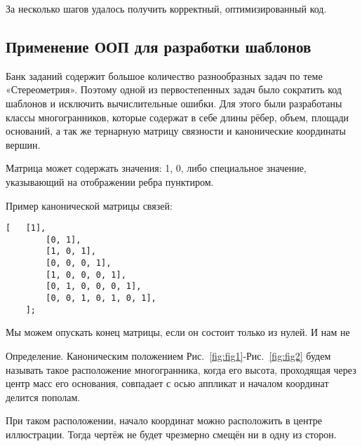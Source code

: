 За несколько шагов удалось получить корректный, оптимизированный код.

\subsection{Применение ООП для разработки шаблонов}


Банк заданий содержит большое количество разнообразных задач по теме «Стереометрия». Поэтому одной из первостепенных задач было сократить код шаблонов и исключить вычислительные ошибки. Для этого были разработаны классы многогранников, которые содержат в себе длины рёбер, объем, площади оснований, а так же тернарную матрицу связности и канонические координаты вершин.

Матрица может содержать значения: 1, 0, либо специальное значение, указывающий на отображении ребра пунктиром.

Пример канонической матрицы связей:

\begin{lstlisting}[caption = {Каноническая матрица связей для параллелепипеда},numbers=none]
	[   [1],
	    [0, 1],
	    [1, 0, 1],
	    [0, 0, 0, 1],
	    [1, 0, 0, 0, 1],
	    [0, 1, 0, 0, 0, 1],
	    [0, 0, 1, 0, 1, 0, 1],
	];
\end{lstlisting}

Мы можем опускать конец матрицы, если он состоит только из нулей. И  нам не

Определение. Каноническим положением Рис.~\ref{fig:fig1}-Рис.~\ref{fig:fig2} будем называть такое расположение многогранника, когда его высота, проходящая через центр масс его основания, совпадает с осью аппликат и началом координат делится пополам.

При таком расположении, начало координат можно расположить в центре иллюстрации. Тогда чертёж не будет чрезмерно смещён ни в одну из сторон.

